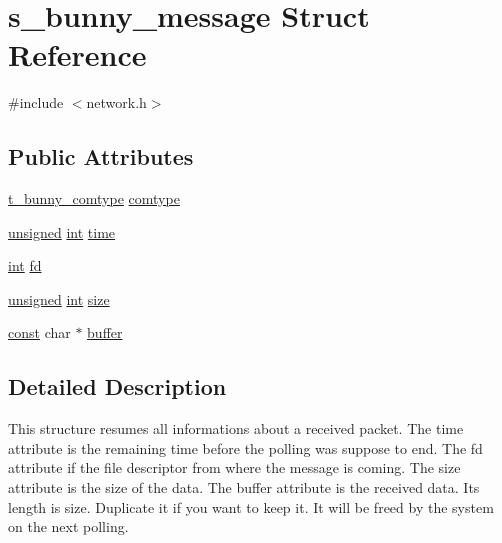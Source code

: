 \hypertarget{structs__bunny__message}{\section{s\-\_\-bunny\-\_\-message Struct Reference}
\label{structs__bunny__message}
}


{\ttfamily \#include $<$network.\-h$>$}

\subsection*{Public Attributes}
\begin{DoxyCompactItemize}
\item 
\hyperlink{network_8h_ac01621d0080b82d3bebc95c8338b24ce}{t\-\_\-bunny\-\_\-comtype} \hyperlink{structs__bunny__message_aac3f30ea75b4f7dad91d75ce0e1053a5}{comtype}
\item 
\hyperlink{curses_8priv_8h_aca40206900cfc164654362fa8d4ad1e6}{unsigned} \hyperlink{term__entry_8h_ad65b480f8c8270356b45a9890f6499ae}{int} \hyperlink{structs__bunny__message_ab5658ada85598e95b40996a587aa971d}{time}
\item 
\hyperlink{term__entry_8h_ad65b480f8c8270356b45a9890f6499ae}{int} \hyperlink{structs__bunny__message_acbb365092fc8dbdca461f03cf5a6309e}{fd}
\item 
\hyperlink{curses_8priv_8h_aca40206900cfc164654362fa8d4ad1e6}{unsigned} \hyperlink{term__entry_8h_ad65b480f8c8270356b45a9890f6499ae}{int} \hyperlink{structs__bunny__message_a45c5feb6cd96bd3408b2358d907e0218}{size}
\item 
\hyperlink{term__entry_8h_a57bd63ce7f9a353488880e3de6692d5a}{const} char $\ast$ \hyperlink{structs__bunny__message_a2d8d242384d65fa193194743592455ff}{buffer}
\end{DoxyCompactItemize}


\subsection{Detailed Description}
This structure resumes all informations about a received packet. The time attribute is the remaining time before the polling was suppose to end. The fd attribute if the file descriptor from where the message is coming. The size attribute is the size of the data. The buffer attribute is the received data. Its length is size. Duplicate it if you want to keep it. It will be freed by the system on the next polling. 

